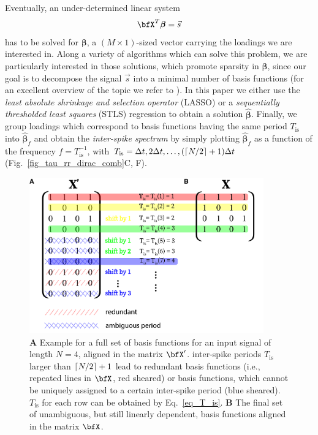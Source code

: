\documentclass[entropy,article,submit,pdftex,moreauthors]{Definitions/mdpi}
\DeclarePairedDelimiter\ceil{\lceil}{\rceil}
\begin{document}
\noindent Eventually, an under-determined linear system
\begin{equation}
\bfX^T \boldsymbol{\beta}=\vec{s}
\label{eq_linear_system}
\end{equation}  
has to be solved for $\boldsymbol\beta$, a $(M\times 1)$-sized vector carrying the loadings we are interested in. Along a variety of algorithms which can solve this problem, we are 
particularly interested in those solutions, which promote sparsity in $\boldsymbol\beta$, since our goal is to decompose the signal $\vec{s}$ into a minimal number of basis 
functions (for an excellent overview of the topic we refer to \citet{Brunton2019}). In this paper we either use the \textit{least absolute shrinkage and selection operator} 
(LASSO) \cite{Tibshirani1996} or a \textit{sequentially thresholded least squares} (STLS) regression \cite{Brunton2016,Brunton2019} to obtain a solution $\hat{\boldsymbol\beta}$. Finally, we group loadings 
which correspond to basis functions having the same period 
$T_\text{is}$ into $\hat{\boldsymbol\beta}_f$ and obtain the 
\textit{inter-spike spectrum} by simply plotting $\hat{\boldsymbol\beta}_f$ as a function of the frequency $f=T_\text{is}^{-1}$, with $T_\text{is}=\Delta t, 2\Delta t, \dots, (\ceil*{N/2}+1) \Delta t$ 
(Fig.~\ref{fig_tau_rr_dirac_comb}C, F).

\begin{figure}
\centering
\includegraphics[width=0.9\textwidth]{./figures/fig_tau_rr_basis_functions}
\caption{\textbf{A} Example for a full set of basis functions for an input signal of length $N=4$, aligned in the matrix $\bfX'$. inter-spike periods $T_{\text{is}}$ larger 
than $\ceil*{N/2}+1$ lead to redundant basis functions (i.e., repeated lines in $\bfX$, red sheared) or basis functions, which cannot be uniquely assigned to a certain inter-spike period 
(blue sheared). $T_{\text{is}}$ for each row can be obtained by Eq.~\eqref{eq_T_is}. \textbf{B} The final set of unambiguous, but still linearly dependent, basis functions aligned in the matrix $\bfX$.} \label{fig_tau_rr_basis_functions}
\end{figure}
\end{document}
